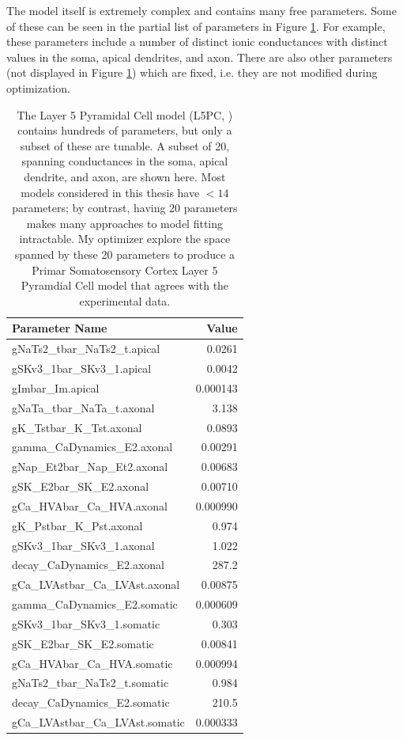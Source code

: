 The model itself is extremely complex and contains many free parameters.
Some of these can be seen in the partial list of parameters in Figure \ref{fig:ca1_parameters}.
For example, these parameters include a number of distinct ionic conductances with distinct values in the soma, apical dendrites, and axon.
There are also other parameters (not displayed in Figure \ref{fig:ca1_parameters}) which are fixed, i.e. they are not modified during optimization.
\begin{table}
\begin{center}
\begin{tabular}{|l|r|}
\toprule
Parameter Name &           Value \\
\midrule
gNaTs2\_tbar\_NaTs2\_t.apical    &    0.0261 \\
gSKv3\_1bar\_SKv3\_1.apical      &    0.0042 \\
gImbar\_Im.apical              &    0.000143 \\
gNaTa\_tbar\_NaTa\_t.axonal      &    3.138 \\
gK\_Tstbar\_K\_Tst.axonal        &    0.0893 \\
gamma\_CaDynamics\_E2.axonal    &    0.00291 \\
gNap\_Et2bar\_Nap\_Et2.axonal    &    0.00683 \\
gSK\_E2bar\_SK\_E2.axonal        &    0.00710 \\
gCa\_HVAbar\_Ca\_HVA.axonal      &    0.000990 \\
gK\_Pstbar\_K\_Pst.axonal        &    0.974 \\
gSKv3\_1bar\_SKv3\_1.axonal      &    1.022 \\
decay\_CaDynamics\_E2.axonal    &  287.2 \\
gCa\_LVAstbar\_Ca\_LVAst.axonal  &    0.00875 \\
gamma\_CaDynamics\_E2.somatic   &    0.000609 \\
gSKv3\_1bar\_SKv3\_1.somatic     &    0.303 \\
gSK\_E2bar\_SK\_E2.somatic       &    0.00841 \\
gCa\_HVAbar\_Ca\_HVA.somatic     &    0.000994 \\
gNaTs2\_tbar\_NaTs2\_t.somatic   &    0.984 \\
decay\_CaDynamics\_E2.somatic   &  210.5 \\
gCa\_LVAstbar\_Ca\_LVAst.somatic &    0.000333 \\
\bottomrule
\end{tabular}
\end{center}
\caption[Subset of Model Parameters for Conductance-based L5PC Neuron]{The Layer 5 Pyramidal Cell model (L5PC, \citep{van2016bluepyopt}
) contains hundreds of parameters, but only a subset of these are tunable.
A subset of 20, spanning conductances in the soma, apical dendrite, and axon, are shown here.
Most models considered in this thesis have $<14$ parameters; by contrast, having 20 parameters makes many approaches to model fitting intractable.
My optimizer explore the space spanned by these 20 parameters to produce a Primar Somatosensory Cortex Layer 5 Pyramdial Cell model that agrees with the experimental data.}
\label{fig:ca1_parameters}
\end{table}

